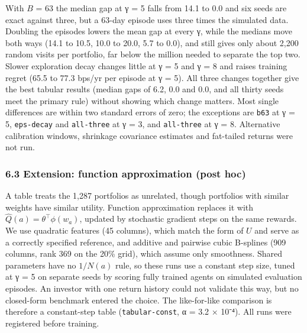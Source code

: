 \documentclass[
  11pt]{article}
\begin{document}
With \(B\) = 63 the median gap at γ = 5 falls from 14.1 to 0.0 and six
seeds are exact against three, but a 63-day episode uses three times the
simulated data. Doubling the episodes lowers the mean gap at every γ,
while the medians move both ways (14.1 to 10.5, 10.0 to 20.0, 5.7 to
0.0), and still gives only about 2,200 random visits per portfolio, far
below the million needed to separate the top two. Slower exploration
decay changes little at γ = 5 and γ = 8 and raises training regret (65.5
to 77.3 bps/yr per episode at γ = 5). All three changes together give
the best tabular results (median gaps of 6.2, 0.0 and 0.0, and all
thirty seeds meet the primary rule) without showing which change
matters. Most single differences are within two standard errors of zero;
the exceptions are \texttt{b63} at γ = 5, \texttt{eps-decay} and
\texttt{all-three} at γ = 3, and \texttt{all-three} at γ = 8.
Alternative calibration windows, shrinkage covariance estimates and
fat-tailed returns were not run.

\subsubsection{6.3 Extension: function approximation (post
hoc)}\label{extension-function-approximation-post-hoc}

A table treats the 1,287 portfolios as unrelated, though portfolios with
similar weights have similar utility. Function approximation replaces it
with \(\hat{Q}(a) = \theta^\top \phi(w_a)\), updated by stochastic
gradient steps on the same rewards. We use quadratic features (45
columns), which match the form of \(U\) and serve as a correctly
specified reference, and additive and pairwise cubic B-splines (909
columns, rank 369 on the 20\% grid), which assume only smoothness.
Shared parameters have no \(1/N(a)\) rule, so these runs use a constant
step size, tuned at γ = 5 on separate seeds by scoring fully trained
agents on simulated evaluation episodes. An investor with one return
history could not validate this way, but no closed-form benchmark
entered the choice. The like-for-like comparison is therefore a
constant-step table (\texttt{tabular-const}, α = 3.2 × 10⁻⁴). All runs
were registered before training.
\end{document}
